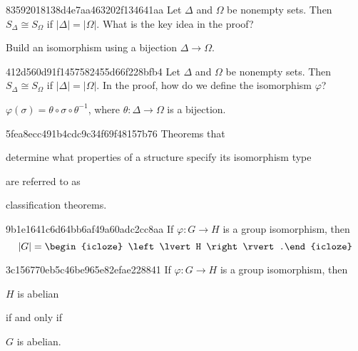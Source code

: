 \begin{note}{83592018138d4e7aa463202f134641aa}
    Let \({ \Delta }\) and \({ \Omega }\) be nonempty sets.
    Then \({ S_{\Delta} \cong S_{\Omega} }\) if \({ \left\lvert \Delta \right\rvert = \left\lvert \Omega \right\rvert }\).
    What is the key idea in the proof?

    \begin{cloze}{1}
        Build an isomorphism using a bijection \({ \Delta \to \Omega }\).
    \end{cloze}
\end{note}

\begin{note}{412d560d91f1457582455d66f228bfb4}
    Let \({ \Delta }\) and \({ \Omega }\) be nonempty sets.
    Then \({ S_{\Delta} \cong S_{\Omega} }\) if \({ \left\lvert \Delta \right\rvert = \left\lvert \Omega \right\rvert }\).
    In the proof, how do we define the isomorphism \({ \varphi }\)?

    \begin{cloze}{1}
        \({ \varphi(\sigma) = \theta \circ \sigma \circ \theta^{-1} }\), where \({ \theta : \Delta \to \Omega }\) is a bijection.
    \end{cloze}
\end{note}

\begin{note}{5fea8ecc491b4cdc9c34f69f48157b76}
    Theorems that \begin{icloze}{2}determine what properties of a structure specify its isomorphism type\end{icloze} are referred to as \begin{icloze}{1}classification theorems.\end{icloze}
\end{note}

\begin{note}{9b1e1641c6d64bb6af49a60adc2cc8aa}
    If \({ \varphi : G \to H }\) is a group isomorphism, then
    \[
        \left\lvert G \right\rvert = \begin{icloze}{1}\left\lvert H \right\rvert.\end{icloze}
    \]
\end{note}

\begin{note}{3c156770eb5c46be965e82efae228841}
    If \({ \varphi : G \to H }\) is a group isomorphism, then
    \begin{center}
        \({ H }\) is abelian \begin{icloze}{2}if and only if\end{icloze} \begin{icloze}{1}\({ G }\) is abelian.\end{icloze}
    \end{center}
\end{note}

